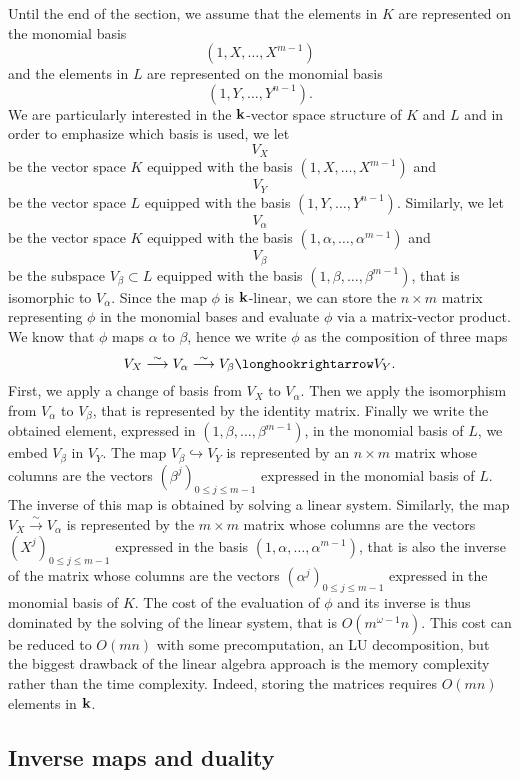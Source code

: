 Until the end of the section, we assume that the elements in $K$ are represented
on the monomial basis
\[
  (1, X, \dots, X^{m-1})
\]
and the elements in $L$ are represented on the monomial basis
\[
  (1, Y, \dots, Y^{n-1}).
\]
We are particularly interested in the $\mathbf{k}$-vector space structure of $K$ and
$L$ and in order to emphasize which basis is used, we let
\[
  V_X
\]
be the vector space $K$ equipped with the basis $(1, X, \dots, X^{m-1})$ and
\[
  V_Y
\]
be the vector space $L$ equipped with the basis $(1, Y, \dots, Y^{n-1})$.
Similarly, we let 
\[
  V_\alpha
\]
be the vector space $K$ equipped with the basis $(1, \alpha, \dots,
\alpha^{m-1})$ and
\[
  V_\beta
\]
be the subspace $V_\beta\subset L$ equipped with the basis $(1, \beta, \dots,
\beta^{m-1})$, that is isomorphic to $V_\alpha$.
Since the map $\phi$ is $\mathbf{k}$-linear, we can store the $n\times m$ matrix representing $\phi$
in the monomial bases and evaluate $\phi$ via a matrix-vector product. We know
that $\phi$ maps $\alpha$ to $\beta$, hence we write $\phi$ as the composition
of three maps
\[
  V_X \overset{\sim}{\longrightarrow} V_\alpha \overset{\sim}{\longrightarrow}
  V_\beta \longhookrightarrow V_Y.
\]
First, we apply a change of basis from $V_X$ to $V_\alpha$. Then we apply the
isomorphism from $V_\alpha$ to $V_\beta$, that is represented by the
identity matrix. Finally we write the obtained element, expressed in $(1,
\beta, \dots, \beta^{m-1})$, in the
monomial basis of $L$, \ie we embed $V_\beta$ in $V_Y$. The map
$V_\beta\hookrightarrow V_Y$ is represented by an $n\times m$ matrix whose
columns are the vectors $(\beta^j)_{0\leq j\leq m-1}$ expressed in the monomial
basis of $L$. The inverse of this map is obtained by solving a linear system.
Similarly, the map $V_X\overset{\sim}{\to}V_\alpha$ is represented
by the $m\times m$ matrix whose columns are the vectors $(X^j)_{0\leq j\leq
m-1}$ expressed in the basis $(1, \alpha, \dots, \alpha^{m-1})$, that is also
the inverse of the matrix whose columns are the vectors $(\alpha^j)_{0\leq j\leq
m-1}$ expressed in the monomial basis of $K$. The cost of the evaluation of
$\phi$ and its inverse is thus dominated by the solving of the linear system,
that is $O(m^{\omega-1}n)$. This cost can be reduced to $O(mn)$ with some
precomputation, \eg an LU decomposition, but the biggest drawback of the linear
algebra approach is the memory complexity rather than the time complexity.
Indeed, storing the matrices requires $O(mn)$ elements in $\mathbf{k}$.

\subsection{Inverse maps and duality}

